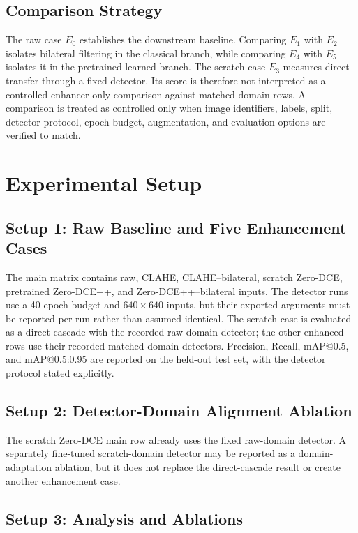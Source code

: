 \documentclass[11pt,a4paper]{article}
\begin{document}
\subsection{Comparison Strategy}

The raw case \(E_0\) establishes the downstream baseline. Comparing \(E_1\)
with \(E_2\) isolates bilateral filtering in the classical branch, while
comparing \(E_4\) with \(E_5\) isolates it in the pretrained learned branch.
The scratch case \(E_3\) measures direct transfer through a fixed detector. Its
score is therefore not interpreted as a controlled enhancer-only comparison
against matched-domain rows. A comparison is treated as controlled only when
image identifiers, labels, split, detector protocol, epoch budget, augmentation,
and evaluation options are verified to match.

\section{Experimental Setup}

\subsection{Setup 1: Raw Baseline and Five Enhancement Cases}

The main matrix contains raw, CLAHE, CLAHE--bilateral, scratch Zero-DCE,
pretrained Zero-DCE++, and Zero-DCE++--bilateral inputs. The detector runs use a
40-epoch budget and \(640\times640\) inputs, but their exported arguments must be
reported per run rather than assumed identical. The scratch case is evaluated
as a direct cascade with the recorded raw-domain detector; the other enhanced rows
use their recorded matched-domain detectors.
Precision, Recall, mAP@0.5, and mAP@0.5:0.95 are reported on the held-out test
set, with the detector protocol stated explicitly.

\subsection{Setup 2: Detector-Domain Alignment Ablation}

The scratch Zero-DCE main row already uses the fixed raw-domain detector. A
separately fine-tuned scratch-domain detector may be reported as a
domain-adaptation ablation, but it does not replace the direct-cascade result or
create another enhancement case.

\subsection{Setup 3: Analysis and Ablations}
\end{document}

